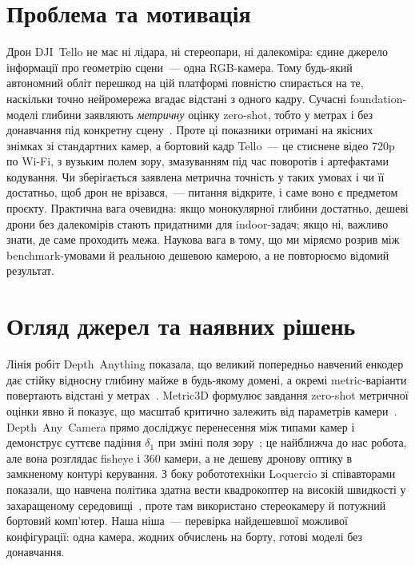 \documentclass[ukrainian]{ucuproposal}
\begin{document}
\maketitlepage

\section{Проблема та мотивація}
Дрон DJI~Tello не має ні лідара, ні стереопари, ні далекоміра: єдине
джерело інформації про геометрію сцени~--- одна RGB-камера. Тому будь-який
автономний обліт перешкод на цій платформі повністю спирається на те,
наскільки точно нейромережа вгадає відстані з одного кадру. Сучасні
foundation-моделі глибини заявляють \emph{метричну} оцінку zero-shot, тобто
у метрах і без донавчання під конкретну сцену~\cite{lin2025depthanything3,
yin2023metric3d}. Проте ці показники отримані на якісних знімках зі
стандартних камер, а бортовий кадр Tello~--- це стиснене відео 720p по
Wi-Fi, з вузьким полем зору, змазуванням під час поворотів і артефактами
кодування. Чи зберігається заявлена метрична точність у таких умовах і чи
її достатньо, щоб дрон не врізався,~--- питання відкрите, і саме воно є
предметом проєкту. Практична вага очевидна: якщо монокулярної глибини
достатньо, дешеві дрони без далекомірів стають придатними для
indoor-задач; якщо ні, важливо знати, де саме проходить межа. Наукова вага
в тому, що ми міряємо розрив між benchmark-умовами й реальною дешевою
камерою, а не повторюємо відомий результат.

\section{Огляд джерел та наявних рішень}
Лінія робіт Depth~Anything показала, що великий попередньо навчений
енкодер дає стійку відносну глибину майже в будь-якому домені, а окремі
metric-варіанти повертають відстані у метрах~\cite{yang2024depthanythingv2,
lin2025depthanything3}. Metric3D формулює завдання zero-shot метричної
оцінки явно й показує, що масштаб критично залежить від параметрів
камери~\cite{yin2023metric3d}. Depth~Any~Camera прямо досліджує перенесення
між типами камер і демонструє суттєве падіння \(\delta_1\) при зміні поля
зору~\cite{guo2025depthanycamera}; це найближча до нас робота, але вона
розглядає fisheye і 360\textdegree{} камери, а не дешеву дронову оптику в
замкненому контурі керування. З боку робототехніки Loquercio зі
співавторами показали, що навчена політика здатна вести квадрокоптер на
високій швидкості у захаращеному середовищі~\cite{loquercio2021highspeed},
проте там використано стереокамеру й потужний бортовий комп'ютер. Наша
ніша~--- перевірка найдешевшої можливої конфігурації: одна камера, жодних
обчислень на борту, готові моделі без донавчання.
\end{document}
